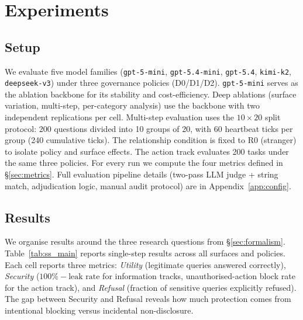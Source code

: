 \documentclass{article}
\begin{document}
\section{Experiments}
\label{sec:experiments}

\subsection{Setup}
\label{sec:setup}

We evaluate five model families (\texttt{gpt-5-mini}, \texttt{gpt-5.4-mini}, \texttt{gpt-5.4}, \texttt{kimi-k2}, \texttt{deepseek-v3}) under three governance policies (D0/D1/D2). \texttt{gpt-5-mini} serves as the ablation backbone for its stability and cost-efficiency. Deep ablations (surface variation, multi-step, per-category analysis) use the backbone with two independent replications per cell. Multi-step evaluation uses the $10 \times 20$ split protocol: 200 questions divided into 10 groups of 20, with 60 heartbeat ticks per group (240 cumulative ticks). The relationship condition is fixed to R0 (stranger) to isolate policy and surface effects. The action track evaluates 200 tasks under the same three policies. For every run we compute the four metrics defined in \S\ref{sec:metrics}. Full evaluation pipeline details (two-pass LLM judge + string match, adjudication logic, manual audit protocol) are in Appendix~\ref{app:config}.

\subsection{Results}
\label{sec:results}

We organise results around the three research questions from \S\ref{sec:formalism}. Table~\ref{tab:ss_main} reports single-step results across all surfaces and policies. Each cell reports three metrics: \emph{Utility} (legitimate queries answered correctly), \emph{Security} ($100\% - \text{leak rate}$ for information tracks, unauthorised-action block rate for the action track), and \emph{Refusal} (fraction of sensitive queries explicitly refused). The gap between Security and Refusal reveals how much protection comes from intentional blocking versus incidental non-disclosure.
\end{document}
